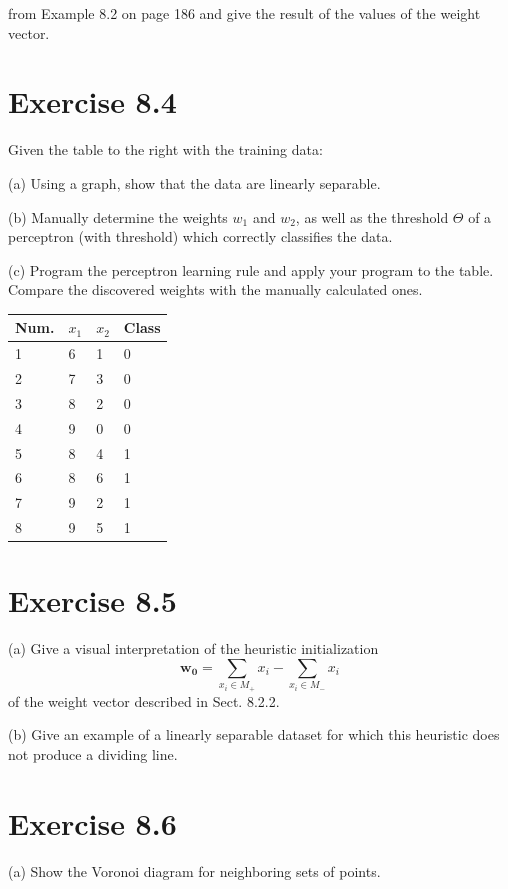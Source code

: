 \documentclass[10pt]{book}
\begin{document}
from Example 8.2 on page 186 and give the result of the values of the weight vector.

\section{Exercise 8.4}
Given the table to the right with the training data:

(a) Using a graph, show that the data are linearly separable.

(b) Manually determine the weights $w_{1}$ and $w_{2}$, as well as the threshold $\Theta$ of a perceptron (with threshold) which correctly classifies the data.

(c) Program the perceptron learning rule and apply your program to the table. Compare the discovered weights with the manually calculated ones.

\begin{table}[ht]
\centering
\begin{tabular}{llll}
\hline
Num. & $x_{1}$ & $x_{2}$ & Class \\
\hline
1 & 6 & 1 & 0 \\
\hline
2 & 7 & 3 & 0 \\
\hline
3 & 8 & 2 & 0 \\
\hline
4 & 9 & 0 & 0 \\
\hline
5 & 8 & 4 & 1 \\
\hline
6 & 8 & 6 & 1 \\
\hline
7 & 9 & 2 & 1 \\
\hline
8 & 9 & 5 & 1 \\
\hline
\end{tabular}
\end{table}

\section{Exercise 8.5}
(a) Give a visual interpretation of the heuristic initialization
$$
\boldsymbol{w}_{\mathbf{0}}=\sum_{x_{i} \in M_{+}} x_{i}-\sum_{x_{i} \in M_{-}} x_{i}
$$
of the weight vector described in Sect. 8.2.2.

(b) Give an example of a linearly separable dataset for which this heuristic does not produce a dividing line.

\section{Exercise 8.6}
(a) Show the Voronoi diagram for neighboring sets of points.
\end{document}
